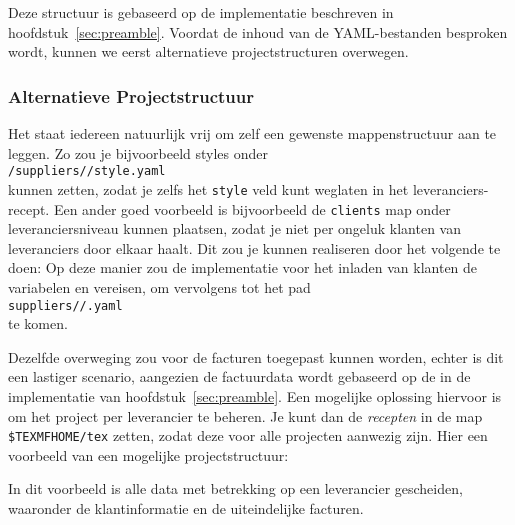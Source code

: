 
Deze structuur is gebaseerd op de implementatie beschreven in hoofdstuk~\ref{sec:preamble}.
Voordat de inhoud van de YAML-bestanden besproken wordt, kunnen we eerst alternatieve projectstructuren overwegen.

\subsubsection{Alternatieve Projectstructuur}
Het staat iedereen natuurlijk vrij om zelf een gewenste mappenstructuur aan te leggen.
Zo zou je bijvoorbeeld styles onder\\
\hspace*{4em}\texttt{/suppliers//style.yaml}\\
kunnen zetten, zodat je zelfs het \texttt{style} veld kunt weglaten in het leveranciers-recept.
Een ander goed voorbeeld is bijvoorbeeld de \texttt{clients} map onder leveranciersniveau kunnen plaatsen, zodat je niet per ongeluk klanten van leveranciers door elkaar haalt.
Dit zou je kunnen realiseren door het volgende te doen:
\noindent
Op deze manier zou de implementatie voor het inladen van klanten de variabelen  en  vereisen, om vervolgens tot het pad\\
\hspace*{4em}\texttt{suppliers//.yaml}\\
te komen.

Dezelfde overweging zou voor de facturen toegepast kunnen worden, echter is dit een lastiger scenario, aangezien de factuurdata wordt gebaseerd op de  in de implementatie van hoofdstuk~\ref{sec:preamble}.
Een mogelijke oplossing hiervoor is om het project per leverancier te beheren.
Je kunt dan de \textit{recepten} in de map \texttt{\$TEXMFHOME/tex} zetten, zodat deze voor alle projecten aanwezig zijn.
Hier een voorbeeld van een mogelijke projectstructuur:\\
\begin{minipage}{.49\linewidth}
\end{minipage}%
\hfill
\begin{minipage}{.49\linewidth}
\end{minipage}
In dit voorbeeld is alle data met betrekking op een leverancier gescheiden, waaronder de klantinformatie en de uiteindelijke facturen.

